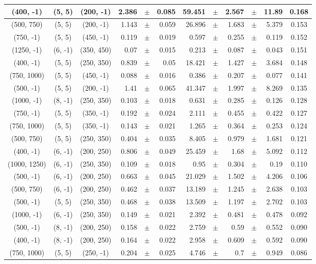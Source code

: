 \documentclass[12pt]{paper}
\begin{document}
\begin{table}[ht]
\begin{center}
{\begin{tabular}{|c|c|c|rrr|rrrrr|c|}
(400, -1)&(5, 5)&(200, -1)&2.386&$\pm$&0.085&59.451&$\pm$&2.567&$\pm$&11.89&0.168\\\hline
(500, 750)&(5, 5)&(200, -1)&1.143&$\pm$&0.059&26.896&$\pm$&1.683&$\pm$&5.379&0.153\\\hline
(750, -1)&(5, 5)&(450, -1)&0.119&$\pm$&0.019&0.597&$\pm$&0.255&$\pm$&0.119&0.152\\\hline
(1250, -1)&(6, -1)&(350, 450)&0.07&$\pm$&0.015&0.213&$\pm$&0.087&$\pm$&0.043&0.151\\\hline
(400, -1)&(5, 5)&(250, 350)&0.839&$\pm$&0.05&18.421&$\pm$&1.427&$\pm$&3.684&0.148\\\hline
(750, 1000)&(5, 5)&(450, -1)&0.088&$\pm$&0.016&0.386&$\pm$&0.207&$\pm$&0.077&0.141\\\hline
(500, -1)&(5, 5)&(200, -1)&1.41&$\pm$&0.065&41.347&$\pm$&1.997&$\pm$&8.269&0.135\\\hline
(1000, -1)&(8, -1)&(250, 350)&0.103&$\pm$&0.018&0.631&$\pm$&0.285&$\pm$&0.126&0.128\\\hline
(750, -1)&(5, 5)&(350, -1)&0.192&$\pm$&0.024&2.111&$\pm$&0.455&$\pm$&0.422&0.127\\\hline
(750, 1000)&(5, 5)&(350, -1)&0.143&$\pm$&0.021&1.265&$\pm$&0.364&$\pm$&0.253&0.124\\\hline
(500, 750)&(5, 5)&(250, 350)&0.404&$\pm$&0.035&8.405&$\pm$&0.979&$\pm$&1.681&0.121\\\hline
(400, -1)&(6, -1)&(200, 250)&0.806&$\pm$&0.049&25.459&$\pm$&1.68&$\pm$&5.092&0.112\\\hline
(1000, 1250)&(6, -1)&(250, 350)&0.109&$\pm$&0.018&0.95&$\pm$&0.304&$\pm$&0.19&0.110\\\hline
(500, -1)&(6, -1)&(200, 250)&0.663&$\pm$&0.045&21.029&$\pm$&1.502&$\pm$&4.206&0.106\\\hline
(500, 750)&(6, -1)&(200, 250)&0.462&$\pm$&0.037&13.189&$\pm$&1.245&$\pm$&2.638&0.103\\\hline
(500, -1)&(5, 5)&(250, 350)&0.468&$\pm$&0.038&13.509&$\pm$&1.197&$\pm$&2.702&0.103\\\hline
(1000, -1)&(6, -1)&(250, 350)&0.149&$\pm$&0.021&2.392&$\pm$&0.481&$\pm$&0.478&0.092\\\hline
(500, -1)&(8, -1)&(200, 250)&0.158&$\pm$&0.022&2.759&$\pm$&0.59&$\pm$&0.552&0.090\\\hline
(400, -1)&(8, -1)&(200, 250)&0.164&$\pm$&0.022&2.958&$\pm$&0.609&$\pm$&0.592&0.090\\\hline
(750, 1000)&(5, 5)&(250, -1)&0.204&$\pm$&0.025&4.746&$\pm$&0.7&$\pm$&0.949&0.086\\\hline

\end{tabular}}
\end{center}
\end{table}
\end{document}
